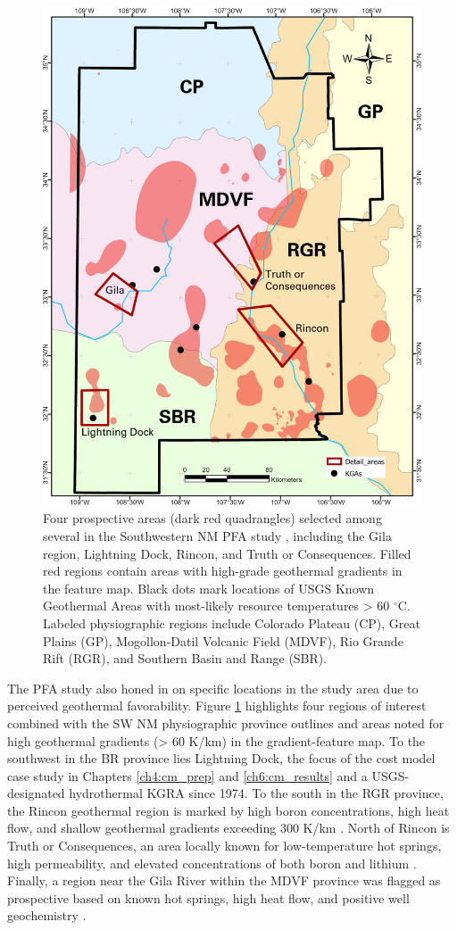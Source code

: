 \begin{figure}
\centering
\includegraphics[width=.75\textwidth]{templates/images/Figure-PFA_Gradient_Labels.png}
\caption[SW New Mexico PFA prospective areas]
{Four prospective areas (dark red quadrangles) selected among several in the Southwestern NM PFA study \protect\citep{bielicki_hydrogeolgic_2015}, including the Gila region, Lightning Dock, Rincon, and Truth or Consequences. Filled red regions contain areas with high-grade geothermal gradients in the \citeauthor{bielicki_hydrogeolgic_2015} feature map. Black dots mark locations of USGS Known Geothermal Areas with most-likely resource temperatures > 60 $^\circ$C. Labeled physiographic regions include Colorado Plateau (CP), Great Plains (GP), Mogollon-Datil Volcanic Field (MDVF), Rio Grande Rift (RGR), and Southern Basin and Range (SBR).}
\label{fig:pfa_prospects}
\end{figure}

The PFA study also honed in on specific locations in the study area due to perceived geothermal favorability. Figure \ref{fig:pfa_prospects} highlights four regions of interest combined with the SW NM physiographic province outlines and areas noted for high geothermal gradients (> 60 K/km) in the \citeauthor{bielicki_hydrogeolgic_2015} gradient-feature map. To the southwest in the BR province lies Lightning Dock, the focus of the cost model case study in Chapters \ref{ch4:cm_prep} and \ref{ch6:cm_results} and a USGS-designated hydrothermal KGRA since 1974. To the south in the RGR province, the Rincon geothermal region is marked by high boron concentrations, high heat flow, and shallow geothermal gradients exceeding 300 K/km \citep{witcher_deep_2002}. North of Rincon is Truth or Consequences, an area locally known for low-temperature hot springs, high permeability, and elevated concentrations of both boron and lithium \citep{pepin_deep_2015}. Finally, a region near the Gila River within the MDVF province was flagged as prospective based on known hot springs, high heat flow, and positive well geochemistry \citep{bielicki_hydrogeolgic_2015} .

